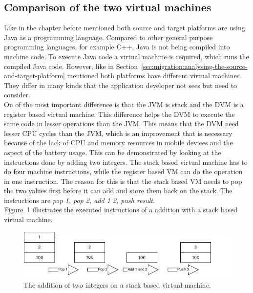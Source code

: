 \subsection{Comparison of the two virtual machines}
\label{sec:migration:comparison-of-the-two-virtual-machines}
Like in the chapter before mentioned both source and target platforms are using Java as a programming language.
Compared to other general purpose programming languages, for example C++, Java is not being compiled into machine code.
To execute Java code a virtual machine is required, which runs the compiled Java code.
However, like in Section~\ref{sec:migration:analysing-the-source-and-target-platform} mentioned both platforms have different virtual machines.
They differ in many kinds that the application developer not sees but need to consider.
\\
On of the most important difference is that the JVM is stack and the DVM is a register based virtual machine.
This difference helps the DVM to execute the same code in lesser operations than the JVM.
This means that the DVM need lesser CPU cycles than the JVM, which is an improvement that is necessary because of the lack of CPU and memory resources in mobile devices and the aspect of the battery usage.
This can be demonstrated by looking at the instructions done by adding two integers.
The stack based virtual machine has to do four machine instructions, while the register based VM can do the operation in one instruction.
The reason for this is that the stack based VM needs to pop the two values first before it can add and store them back on the stack.
The instructions are \textit{pop 1, pop 2, add 1 2, push result}.\\
Figure~\ref{fig:stack-based-addition} illustrates the executed instructions of a addition with a stack based virtual machine.
\begin{figure}[h]
\begin{center}
\includegraphics[scale=0.65]{images/stack-based-addition.png} 
\caption{The addition of two integers on a stack based virtual machine.}
\label{fig:stack-based-addition}
\end{center}
\end{figure}

